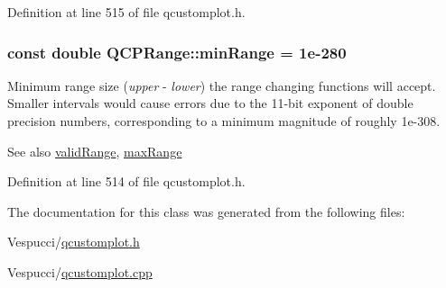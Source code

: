 Definition at line 515 of file qcustomplot.\+h.

\subsubsection[{\texorpdfstring{min\+Range}{minRange}}]{\setlength{\rightskip}{0pt plus 5cm}const double Q\+C\+P\+Range\+::min\+Range = 1e-\/280\hspace{0.3cm}{\ttfamily [static]}}\hypertarget{class_q_c_p_range_ab46d3bc95030ee25efda41b89e2b616b}{}\label{class_q_c_p_range_ab46d3bc95030ee25efda41b89e2b616b}
Minimum range size ({\itshape upper} -\/ {\itshape lower}) the range changing functions will accept. Smaller intervals would cause errors due to the 11-\/bit exponent of double precision numbers, corresponding to a minimum magnitude of roughly 1e-\/308. \begin{DoxySeeAlso}{See also}
\hyperlink{class_q_c_p_range_ab38bd4841c77c7bb86c9eea0f142dcc0}{valid\+Range}, \hyperlink{class_q_c_p_range_a5ca51e7a2dc5dc0d49527ab171fe1f4f}{max\+Range} 
\end{DoxySeeAlso}


Definition at line 514 of file qcustomplot.\+h.



The documentation for this class was generated from the following files\+:\begin{DoxyCompactItemize}
\item 
Vespucci/\hyperlink{qcustomplot_8h}{qcustomplot.\+h}\item 
Vespucci/\hyperlink{qcustomplot_8cpp}{qcustomplot.\+cpp}\end{DoxyCompactItemize}
